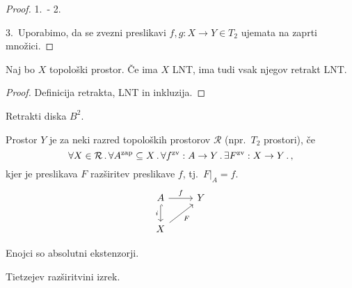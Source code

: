 \begin{proof}
    1.\ - 2.\ \todo{}

    3.\ Uporabimo, da se zvezni preslikavi \(f, g: X \to Y \in T_2\) ujemata na zaprti množici.
\end{proof}

\begin{trditev}
    Naj bo \(X\) topološki prostor. Če ima \(X\) LNT, ima tudi vsak njegov retrakt LNT.
\end{trditev}

\begin{proof}
    Definicija retrakta, LNT in inkluzija.
\end{proof}

\begin{primer}
    Retrakti diska \(B^2\). 
\end{primer}

\begin{definicija}
    Prostor \(Y\) je  za neki razred topoloških prostorov \(\mathcal{R}\) (npr.\ \(T_2\) prostori), če 
    \[\forall X \in \mathcal{R} \,.\, \forall A^{\text{zap}} \subseteq X \,.\, \forall f^\text{zv}: A \to Y \,.\, \exists F^\text{zv}: X \to Y \,.\,,\]
    kjer je preslikava \(F\) razširitev preslikave \(f\), tj.\ \(F|_A = f\).
    \[
    \begin{tikzcd}
        A \arrow{r}{f} \arrow[swap, hook]{d}{i} & Y \\
        X \arrow[swap]{ru}{F}
    \end{tikzcd}
    \]
\end{definicija}

\begin{primer}
    Enojci so absolutni ekstenzorji.
\end{primer}

\begin{opomba}
    Tietzejev razširitvini izrek.
\end{opomba}